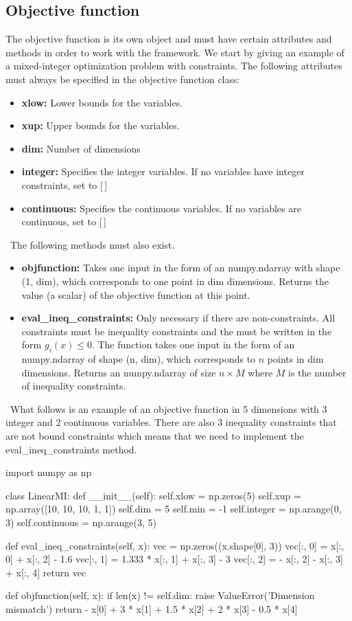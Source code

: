\documentclass[]{article}
\begin{document}
\subsection{Objective function} 
\label{objfun}
The objective function is its own object and must have certain attributes and methods in order to work with the framework. We start by giving an example of a mixed-integer optimization problem with constraints. The following attributes must always be specified in the objective function class:
\begin{itemize}
\item \textbf{xlow:} Lower bounds for the variables.
\item \textbf{xup:} Upper bounds for the variables.
\item \textbf{dim:} Number of dimensions
\item \textbf{integer:} Specifies the integer variables. If no variables have integer constraints, set to [\,]
\item \textbf{continuous:} Specifies the continuous variables. If no variables are continuous, set to [\,]
\end{itemize}
\ \newline The following methods must also exist.
\begin{itemize}
\item \textbf{objfunction:} Takes one input in the form of an numpy.ndarray with shape (1, dim), which corresponds to one point in dim dimensions. Returns the value (a scalar) of the objective function at this point.
\item \textbf{eval\_ineq\_constraints:}  Only necessary if there are non-constraints. All constraints must be inequality constraints and the must be written in the form $g_i(x) \leq 0$. The function takes one input in the form of an numpy.ndarray of shape (n, dim), which corresponds to $n$ points in dim dimensions. Returns an numpy.ndarray of size $n \times M$ where $M$ is the number of inequality constraints.
\end{itemize}
\ \newline \noindent What follows is an example of an objective function in 5 dimensions with 3 integer and 2 continuous variables. There are also 3 inequality constraints that are not bound constraints which means that we need to implement the eval\_ineq\_constraints method.
\begin{python}
import numpy as np

class LinearMI:
    def __init__(self):
        self.xlow = np.zeros(5)
        self.xup = np.array([10, 10, 10, 1, 1])
        self.dim = 5
        self.min = -1
        self.integer = np.arange(0, 3)
        self.continuous = np.arange(3, 5)

    def eval_ineq_constraints(self, x):
        vec = np.zeros((x.shape[0], 3))
        vec[:, 0] = x[:, 0] + x[:, 2] - 1.6
        vec[:, 1] = 1.333 * x[:, 1] + x[:, 3] - 3
        vec[:, 2] = - x[:, 2] - x[:, 3] + x[:, 4]
        return vec

    def objfunction(self, x):
        if len(x) != self.dim:
            raise ValueError('Dimension mismatch')
        return - x[0] + 3 * x[1] + 1.5 * x[2] + 2 * x[3] - 0.5 * x[4]
\end{python}
\end{document}
